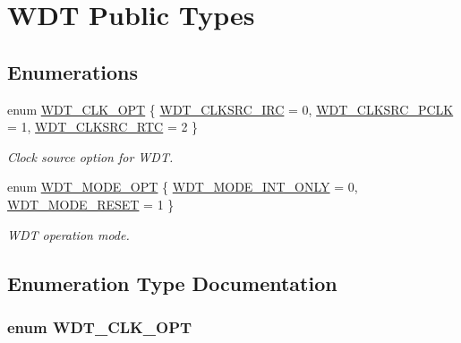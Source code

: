 \hypertarget{group___w_d_t___public___types}{\section{\-W\-D\-T \-Public \-Types}
\label{group___w_d_t___public___types}
}
\subsection*{\-Enumerations}
\begin{DoxyCompactItemize}
\item 
enum \hyperlink{group___w_d_t___public___types_ga3f09add7f3b0d382e9bb23db3cf37bb4}{\-W\-D\-T\-\_\-\-C\-L\-K\-\_\-\-O\-P\-T} \{ \hyperlink{group___w_d_t___public___types_gga3f09add7f3b0d382e9bb23db3cf37bb4a40a209e2f4be4df7febc6aa77a477e5f}{\-W\-D\-T\-\_\-\-C\-L\-K\-S\-R\-C\-\_\-\-I\-R\-C} =  0, 
\hyperlink{group___w_d_t___public___types_gga3f09add7f3b0d382e9bb23db3cf37bb4a0db0fb6a3f48551353bed0d80a9a7b85}{\-W\-D\-T\-\_\-\-C\-L\-K\-S\-R\-C\-\_\-\-P\-C\-L\-K} =  1, 
\hyperlink{group___w_d_t___public___types_gga3f09add7f3b0d382e9bb23db3cf37bb4ab4f2c945534c99d12eadc803a7d099ba}{\-W\-D\-T\-\_\-\-C\-L\-K\-S\-R\-C\-\_\-\-R\-T\-C} =  2
 \}
\begin{DoxyCompactList}\small\item\em \-Clock source option for \-W\-D\-T. \end{DoxyCompactList}\item 
enum \hyperlink{group___w_d_t___public___types_ga9bef6b40714143d8ce7a190d387801fc}{\-W\-D\-T\-\_\-\-M\-O\-D\-E\-\_\-\-O\-P\-T} \{ \hyperlink{group___w_d_t___public___types_gga9bef6b40714143d8ce7a190d387801fca1e1dfb30a3aab5a6cbd979a663ab465e}{\-W\-D\-T\-\_\-\-M\-O\-D\-E\-\_\-\-I\-N\-T\-\_\-\-O\-N\-L\-Y} =  0, 
\hyperlink{group___w_d_t___public___types_gga9bef6b40714143d8ce7a190d387801fca6c9b4ba8bd7850dcd11ff2fd27f453ac}{\-W\-D\-T\-\_\-\-M\-O\-D\-E\-\_\-\-R\-E\-S\-E\-T} =  1
 \}
\begin{DoxyCompactList}\small\item\em \-W\-D\-T operation mode. \end{DoxyCompactList}\end{DoxyCompactItemize}


\subsection{\-Enumeration \-Type \-Documentation}
\hypertarget{group___w_d_t___public___types_ga3f09add7f3b0d382e9bb23db3cf37bb4}{
\subsubsection[{\-W\-D\-T\-\_\-\-C\-L\-K\-\_\-\-O\-P\-T}]{\setlength{\rightskip}{0pt plus 5cm}enum {\bf \-W\-D\-T\-\_\-\-C\-L\-K\-\_\-\-O\-P\-T}}}\label{group___w_d_t___public___types_ga3f09add7f3b0d382e9bb23db3cf37bb4}


